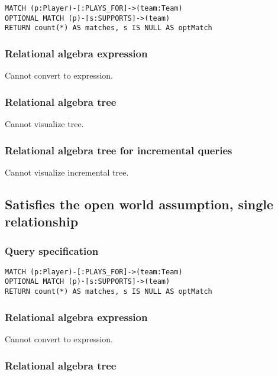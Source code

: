 \begin{lstlisting}
MATCH (p:Player)-[:PLAYS_FOR]->(team:Team)
OPTIONAL MATCH (p)-[s:SUPPORTS]->(team)
RETURN count(*) AS matches, s IS NULL AS optMatch
\end{lstlisting}

\subsubsection*{Relational algebra expression}

Cannot convert to expression.

\subsubsection*{Relational algebra tree}

Cannot visualize tree.

\subsubsection*{Relational algebra tree for incremental queries}

Cannot visualize incremental tree.

\subsection{Satisfies the open world assumption, single relationship}

\subsubsection*{Query specification}

\begin{lstlisting}
MATCH (p:Player)-[:PLAYS_FOR]->(team:Team)
OPTIONAL MATCH (p)-[s:SUPPORTS]->(team)
RETURN count(*) AS matches, s IS NULL AS optMatch
\end{lstlisting}

\subsubsection*{Relational algebra expression}

Cannot convert to expression.

\subsubsection*{Relational algebra tree}

